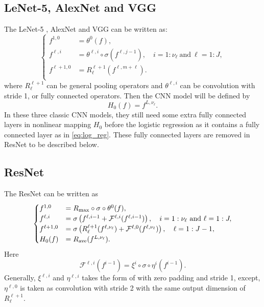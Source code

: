 \subsection{LeNet-5, AlexNet and VGG}
The  LeNet-5 \cite{lecun1998gradient}, AlexNet \cite{krizhevsky2012imagenet} and VGG \cite{simonyan2014very}
can be written as:
	\begin{equation}
	\begin{cases}
	f^{1,0} &= \theta^0(f), \\
	f^{\ell,i} &= \theta^{\ell,i} \circ \sigma (f^{\ell, j-1}), \quad i = 1:\nu_\ell ~\text{and}~ \ell = 1:J,\\
	f^{\ell+1,0} &= R_\ell^{\ell+1}( f^{\ell,m+\ell}).  \\
	\end{cases}
	\end{equation}
	where $R_\ell^{\ell+1}$ can be general pooling operators and $\theta^{\ell,i}$ can be convolution with stride 1, 
	or fully connected operators.  
	Then the CNN model will be defined by
	\begin{equation}\label{eq:cnndefine}
	H_0(f) = f^{L,\nu_\ell}.
	\end{equation}
	In these three classic CNN models, they still need some 
	extra fully connected layers in nonlinear mapping $H_0$ before the logistic regression as it contains 
	a fully connected layer as in \eqref{eq:log_reg}. 
	These fully connected layers are removed in ResNet to be described below.
\subsection{ResNet}
The ResNet \cite{he2016deep} can be written as
	\begin{equation}\label{ori-ResNet}
	\begin{cases}
	f^{1,0} &=R_{\rm max}\circ \sigma \circ \theta^0(f), \\
	f^{\ell,i} &= \sigma \left( f^{\ell, i-1} + \mathcal{F}^{\ell, i} (f^{\ell,i-1}) \right), \quad i = 1:\nu_\ell ~\text{and}~ \ell = 1:J ,\\
	f^{\ell+1,0} &= \sigma \left( R_\ell^{\ell+1} (f^{\ell, \nu_\ell} )+ \mathcal{F}^{\ell, 0} (f^{\ell, \nu_\ell} ) \right), \quad \ell = 1:J-1,\\
	H_0(f) &=  R_{\rm ave}(f^{L,\nu_\ell}). \\
	\end{cases}
	\end{equation}
	Here
	$$
	\mathcal{F}^{\ell,i} (f^{i-1}) = \xi^{i} \circ \sigma \circ \eta^{i} (f^{i-1}).
	$$
	Generally, $\xi^{\ell,i}$ and $\eta^{\ell,i}$ takes the form of \label{eq:conv-1} with zero padding and stride 1,
	except, $\eta^{\ell,0}$  is taken as convolution with stride 2 with the same output dimension of $R_\ell^{\ell+1}$.
	
